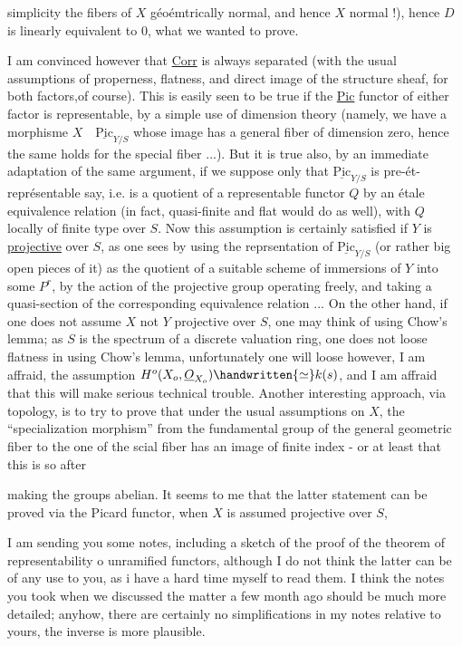simplicity the fibers of $X$ géoémtrically normal, and hence $X$ normal !), hence $D$ is linearly equivalent to $0$, what we wanted to prove.

I am convinced however that \uline{Corr} is always separated (with the usual assumptions of properness, flatness, and direct image of the structure sheaf, for both factors,of course). This is easily seen to be true if the \uline{Pic} functor of either factor is representable, by a simple use of dimension theory (namely, we have a morphisme $X\quad\underline{\mathrm{Pic}}_{Y/S}$ whose image has a general fiber of dimension zero, hence the same holds for the special fiber ...). But it is true also, by an immediate adaptation of the same argument, if we suppose only that $\underline{\mathrm{Pic}}_{Y/S}$ is pre-ét-représentable say, i.e. is a quotient of a representable functor $Q$ by an étale equivalence relation (in fact, quasi-finite and flat would do as well), with $Q$ locally of finite type over $S$. Now this assumption is certainly satisfied if $Y$ is \uline{projective} over $S$, as one sees by using the reprsentation of $\underline{\mathrm{Pic}}_{Y/S}$ (or rather big open pieces of it) as the quotient of a suitable scheme of immersions of $Y$ into some $P^{r}$, by the action of the projective group operating freely, and taking a quasi-section of the corresponding equivalence relation ... On the other hand, if one does not assume $X$ not $Y$ projective over $S$, one may think of using Chow's lemma; as $S$ is the spectrum of a discrete valuation ring, one does not loose flatness in using Chow's lemma, unfortunately one will loose however, I am affraid, the assumption $H^{o}(X_{o},\underline{O}_{X_{o}})\handwritten{\simeq}k(s)$, and I am affraid that this will make serious technical trouble. Another interesting approach, via topology, is to try to prove that under the usual assumptions on $X$, the ``specialization morphism'' from the fundamental group of the general geometric fiber to the one of the scial fiber has an image of finite index - or at least that this is so after

making the groups abelian. It seems to me that the latter statement can be proved via the Picard functor, when $X$ is assumed projective over $S$,

I am sending you some notes, including a sketch of the proof of the theorem of representability o unramified functors, although I do not think the latter can be of any use to you, as i have a hard time myself to read them. I think the notes you took when we discussed the matter a few month ago should be much more detailed; anyhow, there are certainly no simplifications in my notes relative to yours, the inverse is more plausible.

